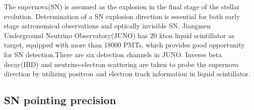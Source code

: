 \documentclass[a4paper,10pt]{cpc-hepnp}
\begin{document}
The supernova(SN) is assumed as the explosion in the final stage of the
stellar evolution. Determination of a SN explosion direction is essential for
both early stage astronomical observations and optically invisible SN.
Jiangmen Underground Neutrino Observatory(JUNO) has 20 kton liquid
scintillator as target, equipped with more than 18000 PMTs, which provides good
opportunity for SN detection.There are six detection channels in JUNO.
Inverse beta decay(IBD) and neutrino-electron scattering are taken to probe the
supernova direction by utilizing positron and electron track information in
liquid scintillator.

\subsection{SN pointing precision}
\end{document}
